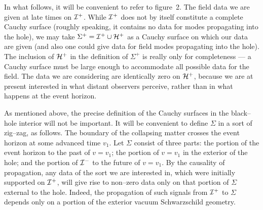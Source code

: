 \vfill\eject

\epsfxsize=4.9in
\centerline{}

\medskip

In what follows, it will be convenient to refer to figure~2.  The
field data we are given at late times on ${\cal I} ^+$.  While ${\cal I} ^+$
does not by itself constitute a complete Cauchy surface (roughly
speaking, it contains no data for modes propagating into the hole),
we may take $\Sigma ^+ ={\cal I} ^+ \cup {\cal H}^+$ as a Cauchy surface
on which our data are given (and also one could give data for field
modes propagating into the hole).
The inclusion  of ${\cal H}^+$ in the definition of $\Sigma ^+$ is
really only for completeness --- a Cauchy surface must be large enough
to accommodate all possible data for the field.
The data we are considering are identically zero on ${\cal H}^+$,
because we are at present interested in what distant observers
perceive, rather than in what happens at the event horizon.  

As mentioned above, the precise definition of the Cauchy surfaces in the
black--hole interior will not be important.  It will be convenient to define
$\Sigma$ in a sort of zig--zag, as follows.  The boundary of the collapsing
matter crosses the event horizon at some advanced time $v_1$.  Let $\Sigma$
consist of three parts:  the portion of the event horizon to the past of
$v=v_1$; the portion of $v=v_1$ in the exterior of the hole; and the portion of
${\cal I} ^-$ to the future of $v=v_1$.
By the causality
of propagation, any data of the sort we are interested in, which were
initially supported on ${\cal I} ^+$, will give rise to non--zero data
only on that portion of $\Sigma$ external to the hole.  Indeed, the
propagation of such signals from ${\cal I} ^+$ to $\Sigma$ depends only
on a portion of the exterior vacuum Schwarzschild geometry.
\xdef\sigsec{\the\secno{}.\the\subno}%

